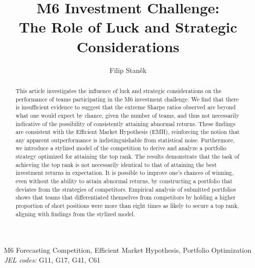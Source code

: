 \documentclass[3p,times,twocolumn]{elsarticle}
\begin{document}
\begin{frontmatter}

    \title{
        M6 Investment Challenge:\\
        The Role of Luck and Strategic Considerations
    }

    \author{
        Filip Staněk
    }
    \address{
        CERGE-EI
    }

    \dochead{}

    \begin{abstract}

        This article investigates the influence of luck and strategic considerations on the performance of teams participating in the M6 investment challenge.
        We find that there is insufficient evidence to suggest that the extreme Sharpe ratios observed are beyond what one would expect by chance, given the number of teams, and thus not necessarily indicative of the possibility of consistently attaining abnormal returns.
        These findings are consistent with the Efficient Market Hypothesis (EMH), reinforcing the notion that any apparent outperformance is indistinguishable from statistical noise.
        Furthermore, we introduce a stylized model of the competition to derive and analyze a portfolio strategy optimized for attaining the top rank.
        The results demonstrate that the task of achieving the top rank is not necessarily identical to that of attaining the best investment returns in expectation.
        It is possible to improve one's chances of winning, even without the ability to attain abnormal returns, by constructing a portfolio that deviates from the strategies of competitors.
        Empirical analysis of submitted portfolios shows that teams that differentiated themselves from competitors by holding a higher proportion of short positions were more than eight times as likely to secure a top rank, aligning with findings from the stylized model.

    \end{abstract}

    \begin{keyword}
        M6 Forecasting Competition, Efficient Market Hypothesis, Portfolio Optimization\\
        \emph{JEL codes:} G11, G17, G41, C61

    \end{keyword}

\end{frontmatter}
\end{document}
